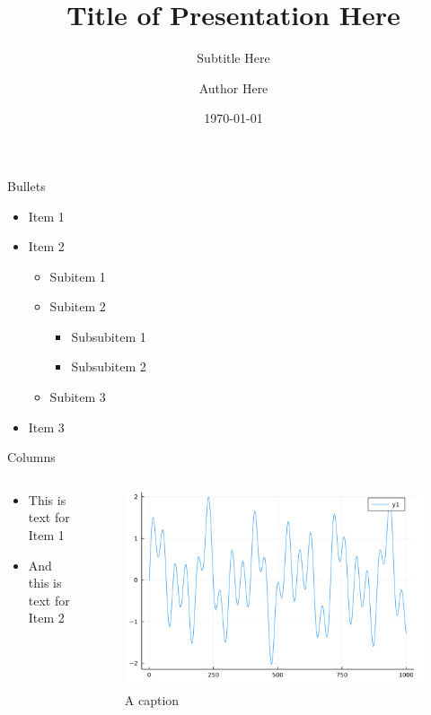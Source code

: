 \documentclass[aspectratio=169, 10pt]{beamer}
\title{Title of Presentation Here}
\subtitle{Subtitle Here}
\author{Author Here}
\date{\today}
\begin{document}
\begin{frame}[plain]
\titlepage
\end{frame}

\begin{frame}{Bullets}
  \begin{itemize}
    \item Item 1
    \item {
        Item 2
        \begin{itemize}
            \item Subitem 1
            \item {
                Subitem 2
                \begin{itemize}
                    \item Subsubitem 1
                    \item Subsubitem 2
                \end{itemize}
            }
            \item Subitem 3
        \end{itemize}
    }
    \item Item 3
  \end{itemize}
\end{frame}

\begin{frame}{Columns}
    \begin{columns}[t]
        \begin{column}{0.5\textwidth}
            \begin{itemize}
                \item This is text for Item 1
                \item And this is text for Item 2
            \end{itemize}
        \end{column}

        \begin{column}{0.5\textwidth}
            \begin{figure}
                \centering
                \includegraphics[width=\textwidth]{
                    assets/slides/image-1.png
                }
                \caption{A caption}
                \label{fig:figure-a}
            \end{figure}
        \end{column}
  \end{columns}
\end{frame}
\end{document}
